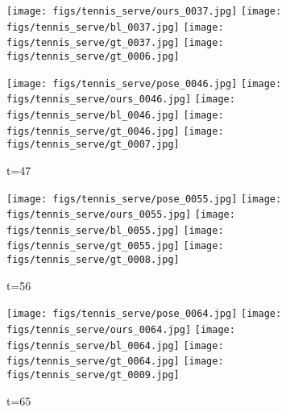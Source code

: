 \documentclass{article}
\begin{document}
\begin{figure*}[thbp]
\begin{subfigure}{0.12\linewidth}
  		\texttt{[image: figs/tennis\_serve/ours\_0037.jpg]}
  		\texttt{[image: figs/tennis\_serve/bl\_0037.jpg]}
  		\texttt{[image: figs/tennis\_serve/gt\_0037.jpg]}
  		\texttt{[image: figs/tennis\_serve/gt\_0006.jpg]}
	\end{subfigure}
	\begin{subfigure}{0.12\linewidth}
        \caption*{t=47}
        \vspace{-7pt}
	    \texttt{[image: figs/tennis\_serve/pose\_0046.jpg]} 
  		\texttt{[image: figs/tennis\_serve/ours\_0046.jpg]}
  		\texttt{[image: figs/tennis\_serve/bl\_0046.jpg]}
  		\texttt{[image: figs/tennis\_serve/gt\_0046.jpg]}
  		\texttt{[image: figs/tennis\_serve/gt\_0007.jpg]}
	\end{subfigure}
	\begin{subfigure}{0.12\linewidth}
        \caption*{t=56}
        \vspace{-7pt}
	    \texttt{[image: figs/tennis\_serve/pose\_0055.jpg]} 
  		\texttt{[image: figs/tennis\_serve/ours\_0055.jpg]}
  		\texttt{[image: figs/tennis\_serve/bl\_0055.jpg]}
  		\texttt{[image: figs/tennis\_serve/gt\_0055.jpg]}
  		\texttt{[image: figs/tennis\_serve/gt\_0008.jpg]}
	\end{subfigure}
	\begin{subfigure}{0.12\linewidth}
        \caption*{t=65}
        \vspace{-7pt}
	    \texttt{[image: figs/tennis\_serve/pose\_0064.jpg]} 
  		\texttt{[image: figs/tennis\_serve/ours\_0064.jpg]}
  		\texttt{[image: figs/tennis\_serve/bl\_0064.jpg]}
  		\texttt{[image: figs/tennis\_serve/gt\_0064.jpg]}
  		\texttt{[image: figs/tennis\_serve/gt\_0009.jpg]}
	\end{subfigure}
    \vspace{.1cm}\\
    \centering


\end{figure*}
\end{document}
